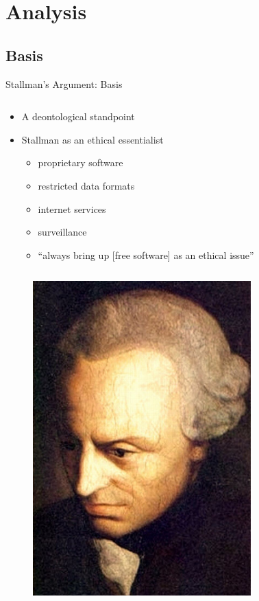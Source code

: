 \section{Analysis}\frame{\sectionpage}

\subsection{Basis}
\begin{frame}{Stallman's Argument: Basis}
  \begin{column}{0.5\textwidth}
    \begin{itemize}
      \item A deontological standpoint
      \item Stallman as an ethical essentialist
        \begin{itemize}
          \item proprietary software
          \item restricted data formats
          \item internet services
          \item surveillance
        \end{itemize}
        \begin{itemize}
          \item ``always bring up [free software] as an ethical issue''~\cite[para. 63]{rms2011}
        \end{itemize}
    \end{itemize}
  \end{column} %
  \begin{column}{0.40\textwidth}\raggedleft{}
    \begin{figure}
      \includegraphics[width = 0.75\textwidth]{images/kant.jpg}
      \caption{\Protect\cite{kant}}
    \end{figure}
  \end{column}
\end{frame}


